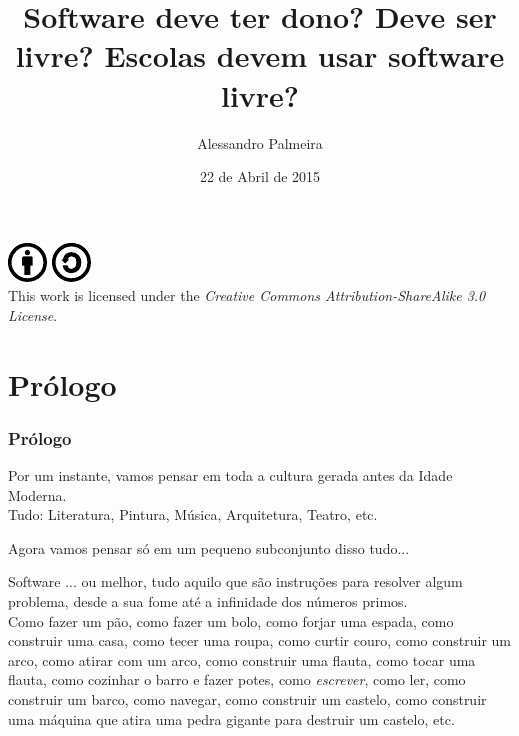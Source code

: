 \documentclass[serif,mathserif]{beamer}
\author[Alessandro Palmeira]{Alessandro Palmeira}
\title[Software Livre e Ensino\hspace{2em}\insertframenumber/\inserttotalframenumber]{Software deve ter dono? Deve ser livre? Escolas devem usar software livre?}
\date{22 de Abril de 2015} %
\institute{MAC0470 - Desenvolvimento de Software Livre}
\newcommand{\CcImageBy}[1]{%
  \includegraphics[scale=#1]{creative_commons/cc_by_30.pdf}%
}
\newcommand{\CcImageSa}[1]{%
  \includegraphics[scale=#1]{creative_commons/cc_sa_30.pdf}%
}
\newcommand{\CcGroupBySa}[2]{%
  \CcImageBy{#1}\hspace*{#2}\CcImageSa{#1}%
}
\newcommand{\CcLongnameBySa}{Attribution-ShareAlike}
\newcommand{\CcNote}[1]{%
  This work is licensed under the \textit{Creative Commons #1 3.0 License}.%
}
\begin{document}
\begin{frame}
  \titlepage
  \begin{center}
    \CcGroupBySa{0.83}{0.95ex}\\
    {\tiny\CcNote{\CcLongnameBySa}}
  \end{center}
\end{frame}



\section{Prólogo}  %

\begin{frame}
  \frametitle{Prólogo}
  Por um instante, vamos pensar em toda a cultura gerada antes da Idade Moderna.\pause\\
  Tudo: Literatura, Pintura, Música, Arquitetura, Teatro, etc.\pause

  \vspace{5mm} %
  Agora vamos pensar só em um pequeno subconjunto disso tudo...
\end{frame}

\begin{frame}
  Software\pause
  ... ou melhor, tudo aquilo que são instruções para resolver algum problema, desde a
  sua fome até a infinidade dos números primos.\pause\\
  Como fazer um pão, \pause como fazer um bolo, \pause como forjar uma espada, \pause como construir uma casa, \pause
  como tecer uma roupa, \pause como curtir couro, \pause como construir um arco, \pause como atirar com um arco, \pause
  como construir uma flauta, \pause como tocar uma flauta, \pause como cozinhar o barro e fazer potes, \pause
  como \emph{escrever}, \pause como ler, \pause como construir um barco, \pause como navegar, \pause como construir
  um castelo, \pause como construir uma máquina que atira uma pedra gigante para destruir
  um castelo, etc.
\end{frame}
\end{document}
